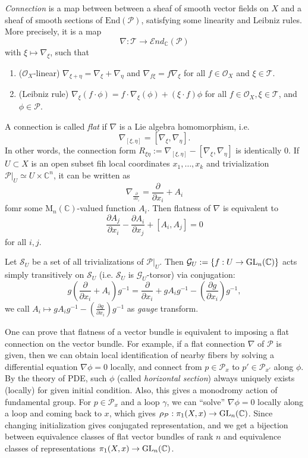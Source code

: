 \emph{Connection} is a map between between a sheaf of smooth vector fields on $X$ and a sheaf of smooth sections
of $\mathrm{End}(\mathcal{P})$, satisfying some linearity and Leibniz rules.
More precisely, it is a map
$$
\nabla: \mathcal{T}\to \mathcal{E}nd_{\mathbb{C}}(\mathcal{P})
$$
with $\xi \mapsto \nabla_{\xi}$, such that 
\begin{enumerate}
    \item ($\mathcal{O}_X$-linear) $\nabla_{\xi + \eta} = \nabla_{\xi} + \nabla_{\eta}$ and $\nabla_{f\xi} = f\nabla_{\xi}$
    for all $f \in \mathcal{O}_{X}$ and $\xi \in \mathcal{T}$.
    \item (Leibniz rule) $\nabla_{\xi}(f\cdot \phi) = f\cdot \nabla_{\xi}(\phi) + (\xi\cdot f)\phi$
    for all $f\in\mathscr{O}_X, \xi \in\mathcal{T}$, and $\phi \in \mathcal{P}$.
\end{enumerate}
A connection is called \emph{flat} if $\nabla$ is a Lie algebra homomorphism, i.e. 
$$
\nabla_{[\xi, \eta]} = [\nabla_{\xi}, \nabla_{\eta}].
$$
In other words, the connection form $R_{\xi\eta}:= \nabla_{[\xi, \eta]} - [\nabla_{\xi}, \nabla_{\eta}]$ is identically 0.
If $U\subset X$ is an open subset fih local coordinates $x_1, \dots, x_k$ and trivialization $\mathcal{P}|_U \simeq U \times \mathbb{C}^n$, it can be written as
$$
\nabla_{\frac{\partial}{\partial x_i}} = \frac{\partial}{\partial x_i} + A_i
$$
fomr some $\mathrm{M}_n(\mathbb{C})$-valued function $A_i$.
Then flatness of $\nabla$ is equivalent to 
$$
\frac{\partial A_{j}}{\partial x_{i}} - \frac{\partial A_{i}}{\partial x_{j}} + [A_i, A_j] =0
$$
for all $i, j$.

Let $\mathcal{S}_U$ be a set of all trivializations of $\mathcal{P}|_U$.
Then $\mathcal{G}_U:=\{f:U \to \operatorname{\mathrm{GL}}_n(\mathbb{C})\}$ acts simply transitively on $\mathcal{S}_U$ (i.e. $\mathcal{S}_U$
is $\mathcal{G}_U$-torsor) via conjugation:
$$
g\left(\frac{\partial}{\partial x_i} + A_i\right)g^{-1} = \frac{\partial}{\partial x_i} + gA_i g^{-1} - \left(\frac{\partial g}{\partial x_i}\right)g^{-1},
$$
we call $A_i \mapsto gA_i g^{-1} - \left(\frac{\partial g}{\partial x_i}\right)g^{-1}$ as \emph{gauge} transform.

One can prove that flatness of a vector bundle is equivalent to imposing a flat connection on the vector bundle.
For example, if a flat connection $\nabla$ of $\mathcal{P}$ is given, then we can obtain local identification of nearby fibers
by solving a differential equation $\nabla \phi = 0$ locally, and connect from $p \in \mathcal{P}_{x}$ to $p' \in \mathcal{P}_{x'}$ along $\phi$.
By the theory of PDE, such $\phi$ (called \emph{horizontal section}) always uniquely exists (locally) for given initial condition.
Also, this gives a monodromy action of fundamental group.
For $p \in \mathcal{P}_x$ and a loop $\gamma$, we can ``solve'' $\nabla \phi = 0$ locally along a loop
and coming back to $x$, which gives $\rho_{\mathcal{P}}: \pi_1(X, x) \to \operatorname{\mathrm{GL}}_n(\mathbb{C})$.
Since changing initialization gives conjugated representation, and we get a bijection between
equivalence classes of flat vector bundles of rank $n$ and equivalence classes of representations $\pi_1(X, x) \to \operatorname{\mathrm{GL}}_n(\mathbb{C})$.
